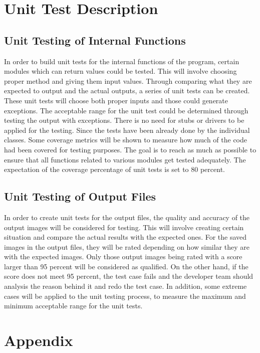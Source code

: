 \documentclass[12pt, titlepage]{article}
\begin{document}
\section{Unit Test Description}

\subsection{Unit Testing of Internal Functions}
In order to build unit tests for the internal functions of the program, certain modules which can return values could be tested. This will involve choosing proper method and giving them input values. Through comparing what they are expected to output and the actual outputs, a series of unit tests can be created. These unit tests will choose both proper inputs and those could generate exceptions. The acceptable range for the unit test could be determined through testing the output with exceptions. There is no need for stubs or drivers to be applied for the testing. Since the tests have been already done by the individual classes. Some coverage metrics will be shown to measure how much of the code had been covered for testing purposes. The goal is to reach as much as possible to ensure that all functions related to various modules get tested adequately. The expectation of the coverage percentage of unit tests is set to 80 percent.
\subsection{Unit Testing of Output Files}
In order to create unit tests for the output files, the quality and accuracy of the output images will be considered for testing. This will involve creating certain situation and compare the actual results with the expected ones. For the saved images in the output files, they will be rated depending on how similar they are with the expected images. Only those output images being rated with a score larger than 95 percent will be considered as qualified. On the other hand, if the score does not meet 95 percent, the test case fails and the developer team should analysis the reason behind it and redo the test case. In addition, some extreme cases will be applied to the unit testing process, to measure the maximum and minimum acceptable range for the unit tests.

				




\newpage

\section{Appendix}
\end{document}
